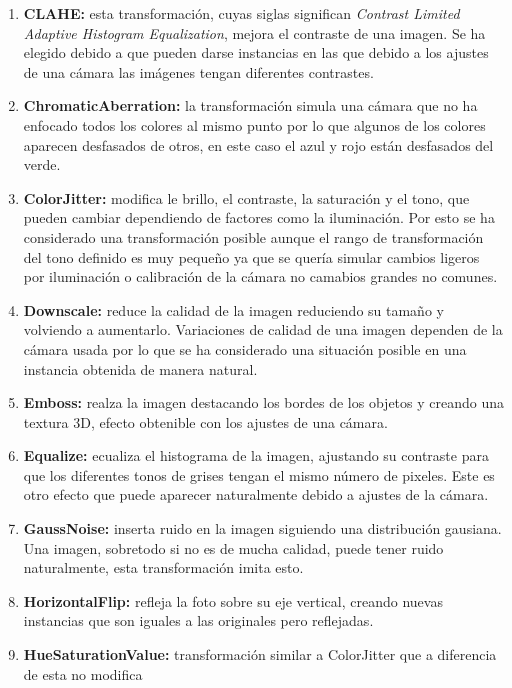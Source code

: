 \documentclass[12pt]{report} %
\begin{document}
    \begin{enumerate} \item \textbf{CLAHE:} esta transformación, cuyas siglas
    significan \textit{Contrast Limited Adaptive Histogram Equalization},
    mejora el contraste de una imagen. Se ha elegido debido a que pueden darse
    instancias en las que debido a los ajustes de una cámara las imágenes
    tengan diferentes contrastes.
    \item \textbf{ChromaticAberration:} la
    transformación simula una cámara que no ha enfocado todos los colores al
    mismo punto por lo que algunos de los colores aparecen desfasados de otros,
    en este caso el azul y rojo están desfasados del verde.
    \item \textbf{ColorJitter:} modifica le brillo, el contraste, la saturación y el
    tono, que pueden cambiar dependiendo de factores como la iluminación. Por
    esto se ha considerado una transformación posible aunque el rango de
    transformación del tono definido es muy pequeño ya que se quería simular
    cambios ligeros por iluminación o calibración de la cámara no camabios
    grandes no comunes.
    \item \textbf{Downscale:} reduce la calidad de la
    imagen reduciendo su tamaño y volviendo a aumentarlo.  Variaciones de
    calidad de una imagen dependen de la cámara usada por lo que se ha
    considerado una situación posible en una instancia obtenida de manera
    natural.
    \item \textbf{Emboss:} realza la imagen destacando los bordes de
    los objetos y creando una textura 3D, efecto obtenible con los ajustes de
    una cámara.
    \item \textbf{Equalize:} ecualiza el histograma de la imagen,
    ajustando su contraste para que los diferentes tonos de grises tengan el
    mismo número de pixeles. Este es otro efecto que puede aparecer
    naturalmente debido a ajustes de la cámara.
    \item \textbf{GaussNoise:}
    inserta ruido en la imagen siguiendo una distribución gausiana. Una imagen,
    sobretodo si no es de mucha calidad, puede tener ruido naturalmente, esta
    transformación imita esto.
    \item \textbf{HorizontalFlip:} refleja la foto
    sobre su eje vertical, creando nuevas instancias que son iguales a las
    originales pero reflejadas.
    \item \textbf{HueSaturationValue:}
    transformación similar a ColorJitter que a diferencia de esta no modifica

\end{enumerate}
\end{document}
